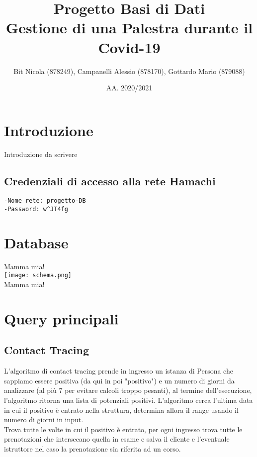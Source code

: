 \documentclass[a4paper,11pt,titlepage]{article}
\title{Progetto Basi di Dati\\Gestione di una Palestra durante il Covid-19}
\author{Bit Nicola (878249), Campanelli Alessio (878170), Gottardo Mario (879088)}
\date{AA. 2020/2021}
\begin{document}
\maketitle
\tableofcontents
\pagebreak
\section{Introduzione}
Introduzione da scrivere
\subsection{Credenziali di accesso alla rete Hamachi}
\begin{verbatim}
-Nome rete: progetto-DB
-Password: w^JT4fg
\end{verbatim}
\section{Database}
Mamma mia!
\\\texttt{[image: schema.png]}\\
Mamma mia!
\section{Query principali}

\subsection{Contact Tracing}
L'algoritmo di contact tracing prende in ingresso un istanza di Persona che sappiamo essere positiva (da qui in poi "positivo") e un numero di giorni da analizzare (al più 7 per evitare calcoli troppo pesanti), al termine dell'esecuzione, l'algoritmo ritorna una lista di potenziali positivi. L'algoritmo cerca l'ultima data in cui il positivo è entrato nella struttura, determina allora il range usando il numero di giorni in input.\\
Trova tutte le volte in cui il positivo è entrato, per ogni ingresso trova tutte le prenotazioni che intersecano quella in esame e salva il cliente e l'eventuale istruttore nel caso la prenotazione sia riferita ad un corso.
\end{document}
